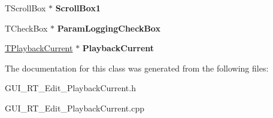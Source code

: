\begin{DoxyCompactItemize}
\item 
\hypertarget{class_t_playback_current_form_a6f94d91a74249ddfefb4b047c9a233f5}{T\+Scroll\+Box $\ast$ {\bfseries Scroll\+Box1}}\label{class_t_playback_current_form_a6f94d91a74249ddfefb4b047c9a233f5}

\item 
\hypertarget{class_t_playback_current_form_ab555bf18508a4d124ae27fbe12d99563}{T\+Check\+Box $\ast$ {\bfseries Param\+Logging\+Check\+Box}}\label{class_t_playback_current_form_ab555bf18508a4d124ae27fbe12d99563}

\item 
\hypertarget{class_t_playback_current_form_acfb4a70754de5619c6b94c9fdb693cc5}{\hyperlink{class_t_playback_current}{T\+Playback\+Current} $\ast$ {\bfseries Playback\+Current}}\label{class_t_playback_current_form_acfb4a70754de5619c6b94c9fdb693cc5}

\end{DoxyCompactItemize}


The documentation for this class was generated from the following files\+:\begin{DoxyCompactItemize}
\item 
G\+U\+I\+\_\+\+R\+T\+\_\+\+Edit\+\_\+\+Playback\+Current.\+h\item 
G\+U\+I\+\_\+\+R\+T\+\_\+\+Edit\+\_\+\+Playback\+Current.\+cpp\end{DoxyCompactItemize}
